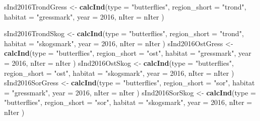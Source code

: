 \documentclass[]{article}
\newenvironment{Shaded}{\begin{snugshade}}{\end{snugshade}}
\newcommand{\KeywordTok}[1]{\textcolor[rgb]{0.13,0.29,0.53}{\textbf{#1}}}
\newcommand{\DataTypeTok}[1]{\textcolor[rgb]{0.13,0.29,0.53}{#1}}
\newcommand{\DecValTok}[1]{\textcolor[rgb]{0.00,0.00,0.81}{#1}}
\newcommand{\StringTok}[1]{\textcolor[rgb]{0.31,0.60,0.02}{#1}}
\newcommand{\NormalTok}[1]{#1}
\begin{document}
\begin{Shaded}
\begin{Highlighting}[]
\NormalTok{sInd2016TrondGress <-}\StringTok{ }\KeywordTok{calcInd}\NormalTok{(}\DataTypeTok{type =} \StringTok{"butterflies"}\NormalTok{,}
                              \DataTypeTok{region_short =} \StringTok{"trond"}\NormalTok{,}
                              \DataTypeTok{habitat =} \StringTok{"gressmark"}\NormalTok{,}
                              \DataTypeTok{year =} \DecValTok{2016}\NormalTok{,}
                              \DataTypeTok{nIter =}\NormalTok{ nIter}
\NormalTok{                              )}
       
\NormalTok{sInd2016TrondSkog <-}\StringTok{ }\KeywordTok{calcInd}\NormalTok{(}\DataTypeTok{type =} \StringTok{"butterflies"}\NormalTok{,}
                              \DataTypeTok{region_short =} \StringTok{"trond"}\NormalTok{,}
                              \DataTypeTok{habitat =} \StringTok{"skogsmark"}\NormalTok{,}
                              \DataTypeTok{year =} \DecValTok{2016}\NormalTok{,}
                              \DataTypeTok{nIter =}\NormalTok{ nIter}
\NormalTok{                              )}
\NormalTok{sInd2016OstGress <-}\StringTok{ }\KeywordTok{calcInd}\NormalTok{(}\DataTypeTok{type =} \StringTok{"butterflies"}\NormalTok{,}
                              \DataTypeTok{region_short =} \StringTok{"ost"}\NormalTok{,}
                              \DataTypeTok{habitat =} \StringTok{"gressmark"}\NormalTok{,}
                              \DataTypeTok{year =} \DecValTok{2016}\NormalTok{,}
                              \DataTypeTok{nIter =}\NormalTok{ nIter}
\NormalTok{                              )}
\NormalTok{sInd2016OstSkog <-}\StringTok{ }\KeywordTok{calcInd}\NormalTok{(}\DataTypeTok{type =} \StringTok{"butterflies"}\NormalTok{,}
                              \DataTypeTok{region_short =} \StringTok{"ost"}\NormalTok{,}
                              \DataTypeTok{habitat =} \StringTok{"skogsmark"}\NormalTok{,}
                              \DataTypeTok{year =} \DecValTok{2016}\NormalTok{,}
                              \DataTypeTok{nIter =}\NormalTok{ nIter}
\NormalTok{                              )}
\NormalTok{sInd2016SorGress <-}\StringTok{ }\KeywordTok{calcInd}\NormalTok{(}\DataTypeTok{type =} \StringTok{"butterflies"}\NormalTok{,}
                              \DataTypeTok{region_short =} \StringTok{"sor"}\NormalTok{,}
                              \DataTypeTok{habitat =} \StringTok{"gressmark"}\NormalTok{,}
                              \DataTypeTok{year =} \DecValTok{2016}\NormalTok{,}
                              \DataTypeTok{nIter =}\NormalTok{ nIter}
\NormalTok{                              )}
\NormalTok{sInd2016SorSkog <-}\StringTok{ }\KeywordTok{calcInd}\NormalTok{(}\DataTypeTok{type =} \StringTok{"butterflies"}\NormalTok{,}
                              \DataTypeTok{region_short =} \StringTok{"sor"}\NormalTok{,}
                              \DataTypeTok{habitat =} \StringTok{"skogsmark"}\NormalTok{,}
                              \DataTypeTok{year =} \DecValTok{2016}\NormalTok{,}
                              \DataTypeTok{nIter =}\NormalTok{ nIter}
\NormalTok{                              )}


\end{Highlighting}
\end{Shaded}
\end{document}
